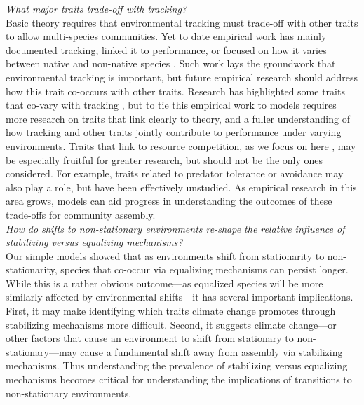\documentclass[11pt,letterpaper]{article}
\begin{document}
\emph{What major traits trade-off with tracking?} \\

Basic theory requires that environmental tracking must trade-off with other traits to allow multi-species communities. Yet to date empirical work has mainly documented tracking, linked it to performance, or focused on how it varies between native and non-native species \citep{Willis:2010al,wolkovichAmBot2013,Zettlemoyer2019}. Such work lays the groundwork that environmental tracking is important, but future empirical research should address how this trait co-occurs with other traits. Research has highlighted some traits that co-vary with tracking \citep[e.g.,][]{kharouba2014,lasky2016,Zhu2016BioLetters}, but to tie this empirical work to models requires more research on traits that link clearly to theory, and a fuller understanding of how tracking and other traits jointly contribute to performance under varying environments. Traits that link to resource competition, as we focus on here \citep[as others have as well, see][]{volkerass}, may be especially fruitful for greater research, but should not be the only ones considered. For example, traits related to predator tolerance or avoidance may also play a role, but have been effectively unstudied.  As empirical research in this area grows, models can aid progress in understanding the outcomes of these trade-offs for community assembly.\\ 

\emph{How do shifts to non-stationary environments re-shape the relative influence of stabilizing versus equalizing mechanisms?} \\

Our simple models showed that as environments shift from stationarity to non-stationarity, species that co-occur via equalizing mechanisms can persist longer. While this is a rather obvious outcome---as equalized species will be more similarly affected by environmental shifts---it has several important implications. First, it may make identifying which traits climate change promotes through stabilizing mechanisms more difficult. Second, it suggests climate change---or other factors that cause an environment to shift from stationary to non-stationary---may cause a fundamental shift away from assembly via stabilizing mechanisms. Thus understanding the prevalence of stabilizing versus equalizing mechanisms \citep[which ecology has worked on for many decades,][]{Caswell:1976np,Chesson:2000vd} becomes critical for understanding the implications of transitions to non-stationary environments. 
\end{document}

